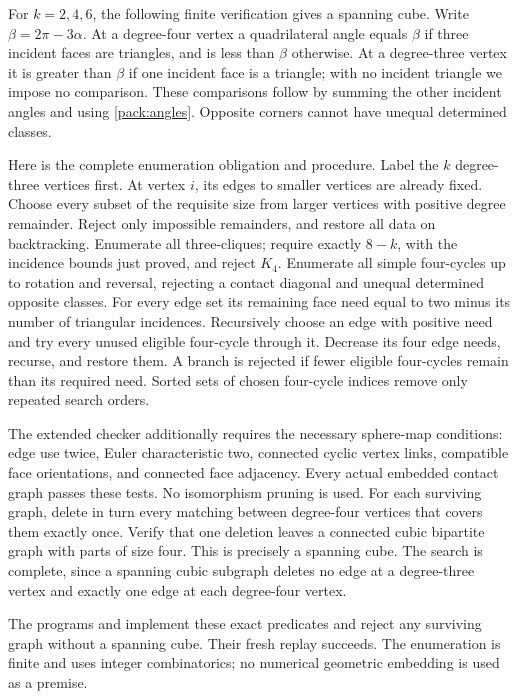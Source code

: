 \documentclass[12pt,reqno]{amsart}
\theoremstyle{definition}
\numberwithin{equation}{section}
\begin{document}
For $k=2,4,6$, the following finite verification gives a spanning cube.
Write $\beta=2\pi-3\alpha$. At a degree-four vertex a quadrilateral
angle equals $\beta$ if three incident
faces are triangles, and is less than $\beta$ otherwise. At a
degree-three vertex it is greater than $\beta$ if one incident face is
a triangle; with no incident triangle we impose no comparison.
These comparisons follow by summing the other incident angles and using
\eqref{pack:angles}. Opposite corners cannot have unequal determined classes.

Here is the complete enumeration obligation and procedure. Label the
$k$ degree-three vertices first. At vertex $i$, its edges to smaller
vertices are already fixed. Choose every subset of the requisite size
from larger vertices with positive degree remainder. Reject only impossible
remainders, and restore all data on backtracking. Enumerate all three-cliques;
require exactly $8-k$, with the incidence bounds just proved, and reject
$K_4$. Enumerate all simple four-cycles up to rotation and reversal,
rejecting a contact diagonal and unequal determined opposite classes.
For every edge set its remaining face need equal to two minus its
number of triangular incidences. Recursively choose an edge with positive
need and try every unused eligible four-cycle through it. Decrease its
four edge needs, recurse, and restore them. A branch is rejected if
fewer eligible four-cycles remain than its required need. Sorted sets
of chosen four-cycle indices remove only repeated search orders.

The extended checker additionally requires the necessary sphere-map
conditions: edge use twice, Euler characteristic two, connected cyclic
vertex links, compatible face orientations, and connected face adjacency.
Every actual embedded contact graph passes these tests. No isomorphism
pruning is used. For each surviving graph, delete in turn every matching
between degree-four vertices that covers them exactly once. Verify that
one deletion leaves a connected cubic bipartite graph with parts of size
four. This is precisely a spanning cube. The search is complete, since
a spanning cubic subgraph deletes no edge at a degree-three vertex and
exactly one edge at each degree-four vertex.

{\raggedright
The programs  and
 implement these exact
predicates and reject any surviving graph without a spanning cube.
Their fresh replay succeeds. The enumeration is finite and uses integer
combinatorics; no numerical geometric embedding is used as a premise.\par}
\end{document}
